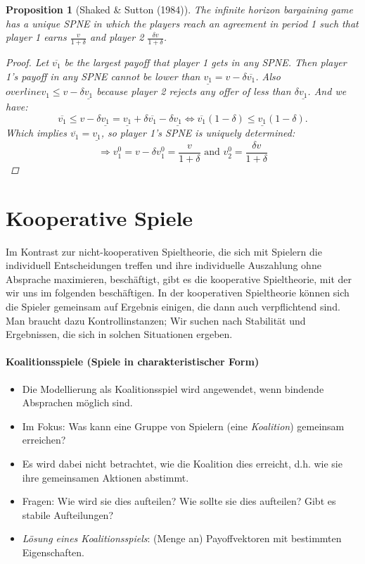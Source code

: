 \documentclass[12pt]{extreport} %
\theoremstyle{named}
\theoremstyle{itshape}
\theoremstyle{normal}
\newtheorem{proposition}[unnamedtheorem]{Proposition}
\begin{document}
\begin{proposition}[Shaked \& Sutton (1984)]
	The infinite horizon bargaining game has a unique SPNE in which the players reach an agreement in period 1 such that player 1 earns $\frac{v}{1 + \delta}$ and player 2 $\frac{\delta v}{1 + \delta}$.
	
	\begin{proof}
		Let $\overline{v_1}$ be the largest payoff that player 1 gets in any SPNE. Then player 1's payoff in any SPNE cannot be lower than $\underline{v_1} = v - \delta \overline{v_1}$. Also $overline{v_1} \leq v - \delta \underline{v_1}$ because player 2 rejects any offer of less than $\delta \underline{v_1}$. And we have:
		$$ \overline{v_1} \leq v - \delta \underline{v_1} = \underline{v_1} + \delta \overline{v_1} - \delta \underline{v_1} \iff \overline{v_1} (1 - \delta) \leq \underline{v_1} (1 - \delta). $$
		Which implies $\overline{v_1} = \underline{v_1}$, so player 1's SPNE is uniquely determined:
		$$ \Rightarrow v_1^0 = v - \delta v_1^0 = \frac{v}{1 + \delta} \text{ and } v_2^0 = \frac{\delta v}{1 + \delta} $$ 
	\end{proof}
\end{proposition}

\chapter{Kooperative Spiele} 


Im Kontrast zur nicht-kooperativen Spieltheorie, die sich mit Spielern die individuell Entscheidungen treffen und ihre individuelle Auszahlung ohne Absprache maximieren, beschäftigt, gibt es die kooperative Spieltheorie, mit der wir uns im folgenden beschäftigen. In der kooperativen Spieltheorie können sich die Spieler gemeinsam auf Ergebnis einigen, die dann auch verpflichtend sind. Man braucht dazu Kontrollinstanzen; Wir suchen nach Stabilität und Ergebnissen, die sich in solchen Situationen ergeben.

\subsubsection*{Koalitionsspiele (Spiele in charakteristischer Form)}
\begin{itemize}
	\item Die Modellierung als Koalitionsspiel wird angewendet, wenn bindende Absprachen möglich sind. 
	\item Im Fokus: Was kann eine Gruppe von Spielern (eine \textit{Koalition}) gemeinsam erreichen? 
	\item Es wird dabei nicht betrachtet, wie die Koalition dies erreicht, d.h. wie sie ihre gemeinsamen Aktionen abstimmt. 
	\item Fragen: Wie wird sie dies aufteilen? Wie sollte sie dies aufteilen? Gibt es stabile Aufteilungen? 
	\item \textit{Lösung eines Koalitionsspiels}: (Menge an) Payoffvektoren mit bestimmten Eigenschaften.
\end{itemize}
\end{document}
